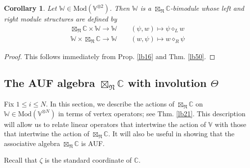 \documentclass[11pt,b5paper,notitlepage]{article}
\theoremstyle{definition}
\theoremstyle{plain}
\newtheorem{co}[df]{Corollary}
\newcommand{\Vbb}{\mathbb V}
\newcommand{\Wbb}{\mathbb W}
\newcommand{\Cbb}{\mathbb C}
\newcommand{\<}{\left\langle}
\renewcommand{\>}{\right\rangle}
\newcommand{\Mod}{\mathrm{Mod}}
\newcommand{\fn}{\mathfrak{N}}
\numberwithin{equation}{section}
\begin{document}
\begin{co}\label{lb26}
Let $\Wbb\in \Mod(\Vbb^{\otimes 2})$. Then $\Wbb$ is a $\boxtimes_\fn\Cbb$-bimodule whose left and right module structures are defined by
\begin{gather*}
\boxtimes_\fn\Cbb\times \Wbb\rightarrow\Wbb\qquad (\psi,w)\mapsto \psi\diamond_L w\\
\Wbb\times\boxtimes_\fn\Cbb\rightarrow\Wbb \qquad (w,\psi)\mapsto w\diamond_R \psi
\end{gather*}
\end{co}

\begin{proof}
This follows immediately from Prop. \ref{lb16} and Thm. \ref{lb50}.
\end{proof}











\subsection{The AUF algebra $\boxtimes_\fn\Cbb$ with involution $\Theta$}


Fix $1\leq i\leq N$. In this section, we describe the actions of $\boxtimes_\fn\Cbb$ on $\Wbb\in\Mod(\Vbb^{\otimes N})$ in terms of vertex operators; see Thm. \ref{lb21}. This description will allow us to relate linear operators that intertwine the action of $\Vbb$ with those that intertwine the action of $\boxtimes_\fn\Cbb$. It will also be useful in showing that the associative algebra $\boxtimes_\fn\Cbb$ is AUF.

Recall that $\zeta$ is the standard coordinate of $\Cbb$.
\end{document}
